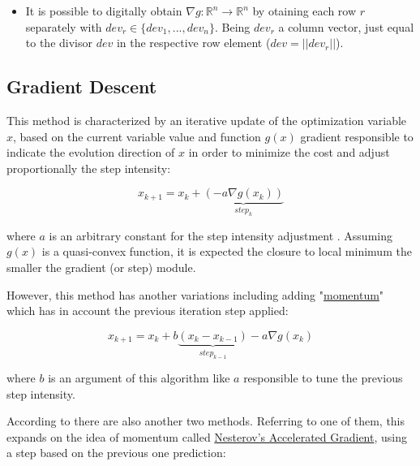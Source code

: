 \begin{tcolorbox}[colback=blue!5!white,colframe=blue!35!white,title=Notes:]
\begin{itemize}
    \item It is possible to digitally obtain \(\nabla g : \mathbb{R}^n \to \mathbb{R}^n\) by otaining each row \(r\) separately with \(dev_r \in \{ dev_1, ..., dev_n \} \). Being \(dev_r \) a column vector, just equal to the divisor \(dev\) in the respective row element (\(dev = ||dev_r||\)).
\end{itemize}
\end{tcolorbox} 



\subsection{Gradient Descent}
\label{subsec:Gradient_Descent} 

This method is characterized by an iterative update of the optimization variable \(x\), based on the current variable value and function \(g(x)\) gradient responsible to indicate the evolution direction of \(x\) in order to minimize the cost and adjust proportionally the step intensity:

\begin{equation}
    x_{k+1} = x_k + \underbrace{(- a \nabla g(x_k))}_{step_{k}}
    \label{eq:Gradient_Descent_Normal}
\end{equation}

where \(a\) is an arbitrary constant for the step intensity adjustment . Assuming \(g(x)\) is a quasi-convex function, it is expected the closure to local minimum the smaller the gradient (or step) module. \par

However, this method has another variations including adding "\underline{momentum}" which has in account the previous iteration step applied:

\begin{equation}
    x_{k+1} = x_k + b \underbrace{(x_k - x_{k-1})}_{step_{k-1}} - a \nabla g(x_k)
    \label{eq:Gradient_Descent_Momentum}
\end{equation}

where \(b\) is an argument of this algorithm like \(a\) responsible to tune the previous step intensity. \par
According to \cite{hao2025analysis} there are also another two methods. Referring  to one of them, this expands on the idea of momentum called \underline{Nesterov's Accelerated Gradient}, using a step based on the previous one prediction: 

